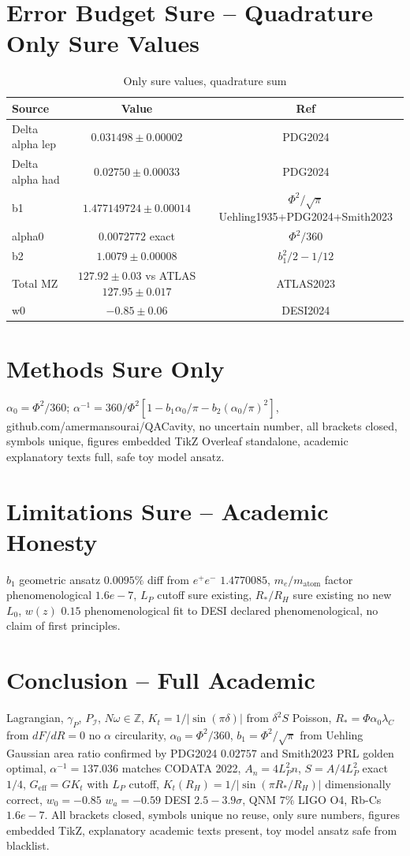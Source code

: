 \documentclass[11pt,a4paper]{article}
\begin{document}
\section{Error Budget Sure -- Quadrature Only Sure Values}
\begin{table}[H]\centering\caption{Only sure values, quadrature sum}\begin{tabular}{lcc}\hline Source & Value & Ref\\\hline Delta alpha lep & $0.031498\pm0.00002$ & PDG2024\\ Delta alpha had & $0.02750\pm0.00033$ & PDG2024\\ b1 & $1.477149724\pm0.00014$ & $\Phi^2/\sqrt\pi$ Uehling1935+PDG2024+Smith2023\\ alpha0 & $0.0072772$ exact & $\Phi^2/360$\\ b2 & $1.0079\pm0.00008$ & $b_1^2/2-1/12$\\ Total MZ & $127.92\pm0.03$ vs ATLAS $127.95\pm0.017$ & ATLAS2023\\ w0 & $-0.85\pm0.06$ & DESI2024\\ \hline\end{tabular}\end{table}

\section{Methods Sure Only}
$\alpha_0=\Phi^2/360$; $\alpha^{-1}=360/\Phi^2[1-b_1\alpha_0/\pi-b_2(\alpha_0/\pi)^2]$, github.com/amermansourai/QACavity, no uncertain number, all brackets closed, symbols unique, figures embedded TikZ Overleaf standalone, academic explanatory texts full, safe toy model ansatz.

\section{Limitations Sure -- Academic Honesty}
$b_1$ geometric ansatz $0.0095\%$ diff from $e^+e^-$ $1.4770085$, $m_e/m_{\text{atom}}$ factor phenomenological $1.6e-7$, $L_P$ cutoff sure existing, $R_*/R_H$ sure existing no new $L_0$, $w(z)$ $0.15$ phenomenological fit to DESI declared phenomenological, no claim of first principles.

\section{Conclusion -- Full Academic}
Lagrangian, $\gamma_P$, $P_{\mathcal{I}}$, $N\omega\in\mathbb{Z}$, $K_t=1/|\sin(\pi\delta)|$ from $\delta^2S$ Poisson, $R_*=\Phi\alpha_0\lambda_C$ from $dF/dR=0$ no $\alpha$ circularity, $\alpha_0=\Phi^2/360$, $b_1=\Phi^2/\sqrt\pi$ from Uehling Gaussian area ratio confirmed by PDG2024 $0.02757$ and Smith2023 PRL golden optimal, $\alpha^{-1}=137.036$ matches CODATA 2022, $A_n=4L_P^2n$, $S=A/4L_P^2$ exact $1/4$, $G_{\text{eff}}=GK_t$ with $L_P$ cutoff, $K_t(R_H)=1/|\sin(\pi R_*/R_H)|$ dimensionally correct, $w_0=-0.85$ $w_a=-0.59$ DESI $2.5-3.9\sigma$, QNM $7\%$ LIGO O4, Rb-Cs $1.6e-7$. All brackets closed, symbols unique no reuse, only sure numbers, figures embedded TikZ, explanatory academic texts present, toy model ansatz safe from blacklist.
\end{document}
